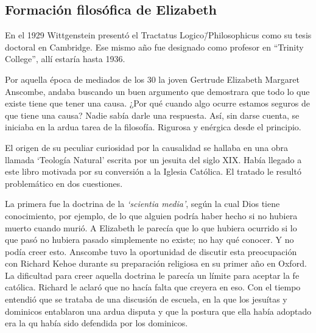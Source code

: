 \subsection{Formación filosófica de Elizabeth}

En el 1929 Wittgenstein presentó el Tractatus Logico\=/Philosophicus como su
tesis doctoral en Cambridge. Ese mismo año fue designado como profesor en
``Trinity College'', allí estaría hasta 1936.


Por aquella época de mediados de los 30 la joven Gertrude Elizabeth Margaret
Anscombe, andaba buscando un buen argumento que demostrara que todo lo que
existe tiene que tener una causa. ¿Por qué cuando algo ocurre estamos seguros de
que tiene una causa? Nadie sabía darle una respuesta.\autocite[cf.~][p.~vii
]{anscombe1981metaphysicsintro} Así, sin darse cuenta, se iniciaba en la ardua
tarea de la filosofía. Rigurosa y enérgica desde el principio.

El origen de su peculiar curiosidad por la causalidad se hallaba en una obra
llamada `Teología Natural' escrita por un jesuita del siglo XIX. Había llegado a
este libro motivada por su conversión a la Iglesia
Católica.\autocite[cf.~][p.~vii]{anscombe1981metaphysicsintro} El tratado le
resultó problemático en dos cuestiones.

La primera fue la doctrina de la \emph{`scientia media'}, según la cual Dios
tiene conocimiento, por ejemplo, de lo que alguien podría haber hecho si no
hubiera muerto cuando murió. A Elizabeth le parecía que lo que hubiera ocurrido
si lo que pasó no hubiera pasado simplemente no existe; no hay qué conocer. Y no
podía creer esto. Anscombe tuvo la oportunidad de discutir esta preocupación con
Richard Kehoe durante su preparación religiosa en su primer año en Oxford. La
dificultad para creer aquella doctrina le parecía un límite para aceptar la fe
católica. Richard le aclaró que no hacía falta que creyera en eso. Con el tiempo
entendió que se trataba de una discusión de escuela, en la que los jesuítas y
dominicos entablaron una ardua disputa y que la postura que ella había adoptado
era la qu había sido defendida por los
dominicos.\autocite[cf.~][p.~vii]{anscombe1981metaphysicsintro}

